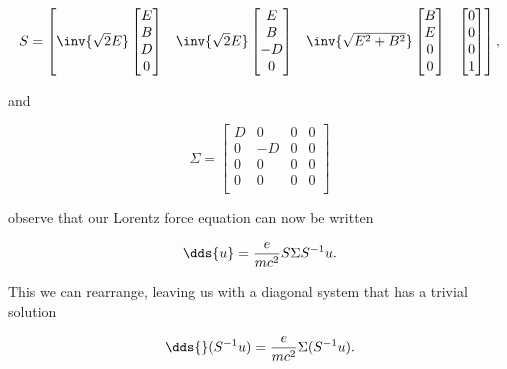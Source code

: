 {\begin{equation}\label{eqn:relElectroDynProblemSet2:710}
S =
\begin{bmatrix}
\inv{\sqrt{2}E}
\begin{bmatrix} 
E \\
B \\
D \\
0
\end{bmatrix} 
&
\inv{\sqrt{2}E}
\begin{bmatrix} 
E \\
B \\
-D \\
0
\end{bmatrix} &
\inv{\sqrt{E^2 + B^2}}
\begin{bmatrix} 
B \\
E \\
0 \\
0 
\end{bmatrix} &
\begin{bmatrix} 
0 \\
0 \\
0 \\
1 
\end{bmatrix}
\end{bmatrix},
\end{equation}

and 

\begin{equation}\label{eqn:relElectroDynProblemSet2:730}
\Sigma = 
\begin{bmatrix}
D & 0 & 0 & 0 \\
0 & -D & 0 & 0 \\
0 & 0 & 0 & 0 \\
0 & 0 & 0 & 0 \\
\end{bmatrix}
\end{equation}

observe that our Lorentz force equation can now be written

\begin{equation}\label{eqn:relElectroDynProblemSet2:750}
\dds{u} = \frac{e}{m c^2} S \Sigma S^{-1} u.
\end{equation}

This we can rearrange, leaving us with a diagonal system that has a trivial solution

\begin{equation}\label{eqn:relElectroDynProblemSet2:770}
\dds{} (S^{-1} u) = \frac{e}{m c^2} \Sigma (S^{-1} u).
\end{equation}

}
